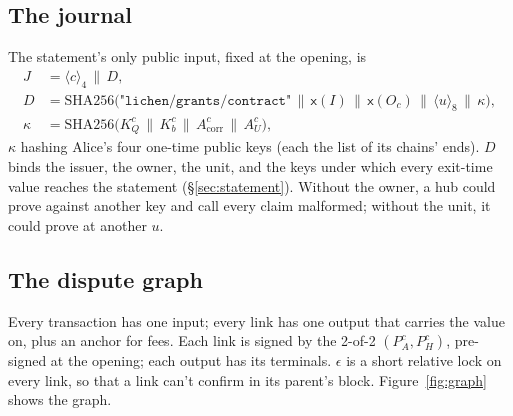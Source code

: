 \documentclass[11pt]{article}
\theoremstyle{plain}
\theoremstyle{definition}
\newcommand{\be}[2]{\langle #1\rangle_{#2}}
\newcommand{\xo}[1]{\mathsf{x}(#1)}
\newcommand{\PH}{P_H^{c}}
\newcommand{\Oc}{O_c}
\newcommand{\KQ}{K_{Q}^{c}}
\newcommand{\Kb}{K_{b}^{c}}
\newcommand{\Acorr}{A_{\mathrm{corr}}^{c}}
\newcommand{\AU}{A_{U}^{c}}
\begin{document}
\subsection{The journal}\label{sec:journal}

The statement's only public input, fixed at the opening, is
\begin{align*}
  J &= \be{c}{4} \,\|\, D,\\
  D &= \mathrm{SHA256}\big(\texttt{"lichen/grants/contract"} \,\|\,
  \xo{I} \,\|\, \xo{\Oc} \,\|\, \be{u}{8} \,\|\, \kappa\big),\\
  \kappa &= \mathrm{SHA256}\big(\KQ \,\|\, \Kb \,\|\, \Acorr \,\|\, \AU\big),
\end{align*}
$\kappa$ hashing Alice's four one-time public keys (each the list of its
chains' ends). $D$ binds the issuer, the owner, the unit, and the keys
under which every exit-time value reaches the statement
(\S\ref{sec:statement}). Without the owner, a hub could prove against
another key and call every claim malformed; without the unit, it could
prove at another $u$.

\subsection{The dispute graph}\label{sec:graph}

Every transaction has one input; every link has one output that carries
the value on, plus an anchor for fees. Each link is signed by the 2-of-2
$(P_A^c, \PH)$, pre-signed at the opening; each output has its
terminals. $\epsilon$ is a short relative lock on every link, so that a
link can't confirm in its parent's block. Figure~\ref{fig:graph} shows
the graph.
\end{document}
